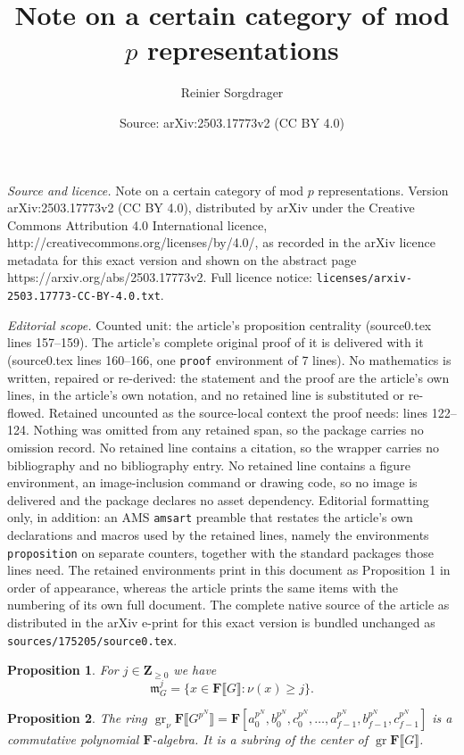 \documentclass[10pt,a4paper]{amsart}
\title{Note on a certain category of mod $p$ representations}
\author{Reinier Sorgdrager}
\date{Source: arXiv:2503.17773v2 (CC BY 4.0)}
\newtheorem{proposition}{Proposition}
\DeclareMathOperator{\gr}{gr}
\begin{document}
\maketitle

\noindent\emph{Source and licence.} Note on a certain category of mod $p$ representations. Version arXiv:2503.17773v2 (CC BY 4.0), distributed by arXiv under the Creative Commons Attribution 4.0 International licence, http://creativecommons.org/licenses/by/4.0/, as recorded in the arXiv licence metadata for this exact version and shown on the abstract page https://arxiv.org/abs/2503.17773v2. Full licence notice: \texttt{licenses/arxiv-2503.17773-CC-BY-4.0.txt}.\par\smallskip

\noindent\textit{Editorial scope.} Counted unit: the article's proposition centrality (source0.tex lines 157--159). The article's complete original proof of it is delivered with it (source0.tex lines 160--166, one \texttt{proof} environment of 7 lines). No mathematics is written, repaired or re-derived: the statement and the proof are the article's own lines, in the article's own notation, and no retained line is substituted or re-flowed.  Retained uncounted as the source-local context the proof needs: lines 122--124.  Nothing was omitted from any retained span, so the package carries no omission record.  No retained line contains a citation, so the wrapper carries no bibliography and no bibliography entry.  No retained line contains a figure environment, an image-inclusion command or drawing code, so no image is delivered and the package declares no asset dependency.  Editorial formatting only, in addition: an AMS \texttt{amsart} preamble that restates the article's own declarations and macros used by the retained lines, namely the environments \texttt{proposition} on separate counters, together with the standard packages those lines need.  The retained environments print in this document as Proposition 1 in order of appearance, whereas the article prints the same items with the numbering of its own full document.  The complete native source of the article as distributed in the arXiv e-print for this exact version is bundled unchanged as \texttt{sources/175205/source0.tex}.
	\begin{proposition}\label{maxideals}
		For $j\in\mathbf Z_{\geq0}$ we have $$\mathfrak m_G^j=\{x\in\mathbf F\llbracket G\rrbracket\colon\nu(x)\geq j\}.$$
	\end{proposition}

	\begin{proposition}\label{centrality}
		The ring $\gr_\nu\mathbf F\llbracket G^{p^N}\rrbracket=\mathbf F[a_0^{p^N},b_0^{p^N},c_0^{p^N},\dots,a_{f-1}^{p^N},b_{f-1}^{p^N},c_{f-1}^{p^N}]$ is a commutative polynomial $\mathbf F$-algebra. It is a subring of the center of $\gr\mathbf F\llbracket G\rrbracket$.
	\end{proposition}
\end{document}
